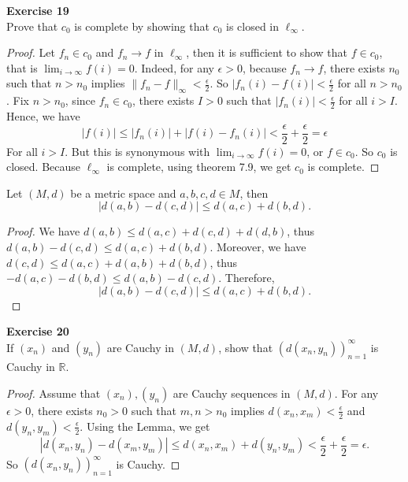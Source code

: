 \documentclass[12pt, a4paper]{article}
\theoremstyle{plain}
\newcommand{\R}{\mathbb{R}}
\newenvironment{exercise}[2][Exercise]
    { \begin{mdframed}[backgroundcolor=gray!20] \textbf{#1 #2} \\}
    {  \end{mdframed}}
\begin{document}
\begin{exercise}{19}
Prove that $c_0$ is complete by showing that $c_0$ is closed in $\ell_\infty$.
\end{exercise}
	\begin{proof}
	Let $f_n\in c_0$ and $f_n\rightarrow f$ in $\ell_\infty$, then it is sufficient to show that $f\in c_0$, that is $\lim_{i\rightarrow\infty}f(i)=0$. Indeed, for any $\epsilon>0$, because $f_n\rightarrow f$, there exists $n_0$ such that $n>n_0$ implies $\|f_n-f\|_\infty<\frac{\epsilon}{2}$. So $|f_n(i)-f(i)|<\frac{\epsilon}{2}$ for all $n>n_0$. Fix $n>n_0$, since $f_n\in c_0$, there exists $I>0$ such that $|f_n(i)|<\frac{\epsilon}{2}$ for all $i>I$. Hence, we have
	\[
	|f(i)|\leq |f_n(i)|+|f(i)-f_n(i)|<\frac{\epsilon}{2}+\frac{\epsilon}{2}=\epsilon
	\]
	For all $i>I$. But this is synonymous with $\lim_{i\rightarrow\infty}f(i)=0$, or $f\in c_0$. So $c_0$ is closed. Because $\ell_\infty$ is complete, using theorem 7.9, we get $c_0$ is complete.
	\end{proof}

\begin{lemma}{}
	Let $(M,d)$ be a metric space and $a,b,c,d\in M$, then
	\[
	|d(a,b)-d(c,d)|\leq d(a,c)+d(b,d).
	\]
\end{lemma}
	\begin{proof}
	We have $d(a,b)\leq d(a,c)+d(c,d)+d(d,b)$, thus $d(a,b)-d(c,d)\leq d(a,c)+d(b,d)$. Moreover, we have $d(c,d)\leq d(a,c)+d(a,b)+d(b,d)$, thus $-d(a,c)-d(b,d)\leq d(a,b)-d(c,d)$. Therefore, 
	\[
	|d(a,b)-d(c,d)|\leq d(a,c)+d(b,d).
	\]
	\end{proof}
\begin{exercise}{20}
If $(x_n)$ and $(y_n)$ are Cauchy in $(M,d)$, show that $(d(x_n,y_n))_{n=1}^\infty$ is Cauchy in $\R$.
\end{exercise}
	\begin{proof}
	Assume that $(x_n),(y_n)$ are Cauchy sequences in $(M,d)$. For any $\epsilon>0$, there exists $n_0>0$ such that $m,n>n_0$ implies $d(x_n,x_m)<\frac{\epsilon}{2}$ and $d(y_n,y_m)<\frac{\epsilon}{2}$. Using the Lemma, we get
	\[
	|d(x_n,y_n)-d(x_m,y_m)|\leq d(x_n,x_m)+d(y_n,y_m)<\frac{\epsilon}{2}+\frac{\epsilon}{2}=\epsilon.
	\]
	So $(d(x_n,y_n))_{n=1}^\infty$ is Cauchy.
	\end{proof}

\pagebreak
\end{document}
